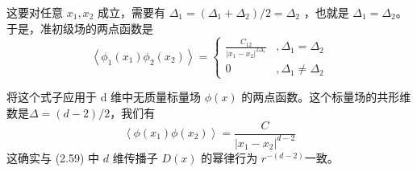 这要对任意 $x_1,x_2$ 成立，需要有 $\Delta_{1}=(\Delta_{1}+\Delta_{2})/2=\Delta_{2}$ ，也就是 $\Delta_1=\Delta_2 $。于是，准初级场的两点函数是
\begin{equation}
	\left\langle\phi_{1}\left(x_{1}\right) \phi_{2}\left(x_{2}\right)\right\rangle=\left\{\begin{array}{cc} \frac{C_{12}}{\left|x_{1}-x_{2}\right|^{2 \Delta_{1}}} &, \Delta_{1}=\Delta_{2} \\ 0 &, \Delta_{1} \neq \Delta_{2} \end{array}\right.
\end{equation}

将这个式子应用于 d 维中无质量标量场 $\phi(x)$ 的两点函数。这个标量场的共形维数是$ \Delta=(d-2)/2 $，我们有
\begin{equation}
	\left\langle\phi\left(x_{1}\right) \phi\left(x_{2}\right)\right\rangle=\frac{C}{\left|x_{1}-x_{2}\right|^{d-2}}
\end{equation}
这确实与 (2.59) 中 $d$ 维传播子 $D(x)$ 的幂律行为 $r^{-(d-2)} $一致。

